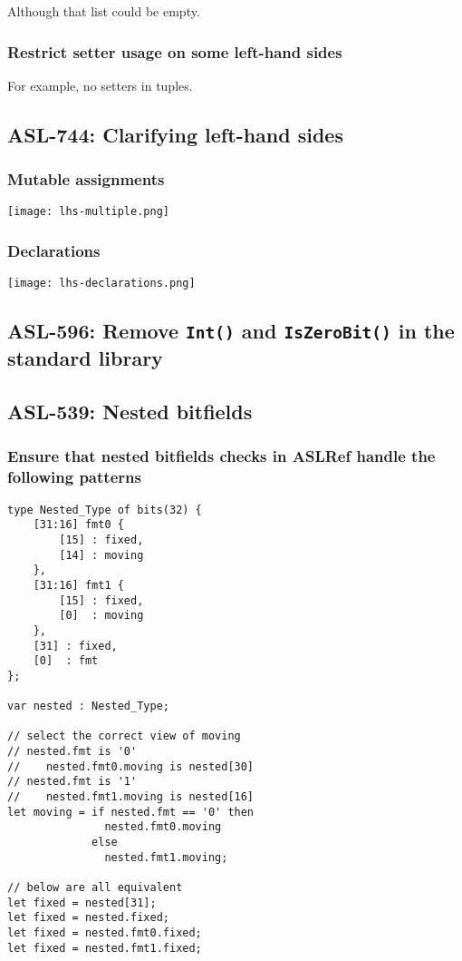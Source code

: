 Although that list could be empty.

\subsubsection{Restrict setter usage on some left-hand sides}

For example, no setters in tuples.

\subsection{ASL-744: Clarifying left-hand sides}

\subsubsection{Mutable assignments}

\texttt{[image: lhs-multiple.png]}

\subsubsection{Declarations}

\texttt{[image: lhs-declarations.png]}

\subsection{ASL-596: Remove \texttt{Int()} and \texttt{IsZeroBit()} in the standard library}

\subsection{ASL-539: Nested bitfields}

\subsubsection{Ensure that nested bitfields checks in ASLRef handle the following patterns}

\begin{verbatim}
type Nested_Type of bits(32) {
    [31:16] fmt0 {
        [15] : fixed,
        [14] : moving
    },
    [31:16] fmt1 {
        [15] : fixed,
        [0]  : moving
    },
    [31] : fixed,
    [0]  : fmt
};

var nested : Nested_Type;

// select the correct view of moving
// nested.fmt is '0'
//    nested.fmt0.moving is nested[30]
// nested.fmt is '1'
//    nested.fmt1.moving is nested[16]
let moving = if nested.fmt == '0' then
               nested.fmt0.moving
             else
               nested.fmt1.moving;

// below are all equivalent
let fixed = nested[31];
let fixed = nested.fixed;
let fixed = nested.fmt0.fixed;
let fixed = nested.fmt1.fixed;
\end{verbatim}

